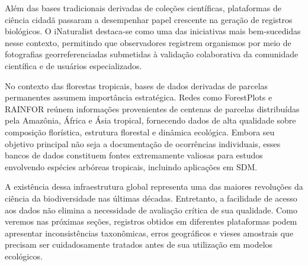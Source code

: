 Além das bases tradicionais derivadas de coleções científicas, plataformas de ciência cidadã passaram a desempenhar papel crescente na geração de registros biológicos. O iNaturalist destaca-se como uma das iniciativas mais bem-sucedidas nesse contexto, permitindo que observadores registrem organismos por meio de fotografias georreferenciadas submetidas à validação colaborativa da comunidade científica e de usuários especializados.

No contexto das florestas tropicais, bases de dados derivadas de parcelas permanentes assumem importância estratégica. Redes como ForestPlots e RAINFOR reúnem informações provenientes de centenas de parcelas distribuídas pela Amazônia, África e Ásia tropical, fornecendo dados de alta qualidade sobre composição florística, estrutura florestal e dinâmica ecológica. Embora seu objetivo principal não seja a documentação de ocorrências individuais, esses bancos de dados constituem fontes extremamente valiosas para estudos envolvendo espécies arbóreas tropicais, incluindo aplicações em SDM.

A existência dessa infraestrutura global representa uma das maiores revoluções da ciência da biodiversidade nas últimas décadas. Entretanto, a facilidade de acesso aos dados não elimina a necessidade de avaliação crítica de sua qualidade. Como veremos nas próximas seções, registros obtidos em diferentes plataformas podem apresentar inconsistências taxonômicas, erros geográficos e vieses amostrais que precisam ser cuidadosamente tratados antes de sua utilização em modelos ecológicos.


